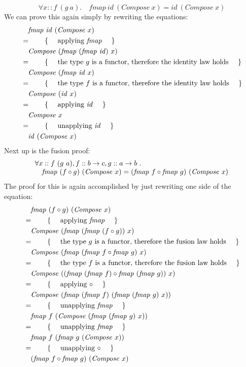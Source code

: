 \begin{displaymath}
\forall x :: \mathit{f}~(g~a). \quad \mathit{fmap}~\mathit{id}~(\mathit{Compose}~x) = \mathit{id}~(\mathit{Compose}~x)
\end{displaymath}
We can prove this again simply by rewriting the equations:
\begin{align*}
&\quad \mathit{fmap}~\mathit{id}~(\mathit{Compose}~x)\\
&=\qquad\text{\{\quad\ applying $\mathit{fmap}$ \quad\}}\\
&\quad \mathit{Compose}~(\mathit{fmap}~(\mathit{fmap}~\mathit{id})~x)\\
&=\qquad\text{\{\quad\ the type $g$ is a functor, therefore the identity law holds \quad\}}\\
&\quad \mathit{Compose}~(\mathit{fmap}~\mathit{id}~x)\\
&=\qquad\text{\{\quad\ the type $f$ is a functor, therefore the identity law holds \quad\}}\\
&\quad \mathit{Compose}~(\mathit{id}~x)\\
&=\qquad\text{\{\quad\ applying $\mathit{id}$ \quad\}}\\
&\quad \mathit{Compose}~x\\
&=\qquad\text{\{\quad\ unapplying $\mathit{id}$ \quad\}}\\
&\quad \mathit{id}~(\mathit{Compose}~x)
\end{align*}
Next up is the fusion proof:
\begin{displaymath}
\begin{array}{lc}
\forall x :: f~(g~a), f :: b \to c, g :: a \to b~. & \\ 
\multicolumn{2}{l}{\quad \mathit{fmap}~(f \circ g)~(\mathit{Compose}~x) = (\mathit{fmap}~f \circ \mathit{fmap}~g)~(\mathit{Compose}~x)}
\end{array}
\end{displaymath}
The proof for this is again accomplished by just rewriting one side of the equation:
\begin{align*}
&\quad \mathit{fmap}~(f \circ g)~(\mathit{Compose}~x)\\
&=\qquad\text{\{\quad\ applying $\mathit{fmap}$ \quad\}}\\
&\quad \mathit{Compose}~(\mathit{fmap}~(\mathit{fmap}~(f \circ g))~x)\\
&=\qquad\text{\{\quad\ the type $g$ is a functor, therefore the fusion law holds \quad\}}\\
&\quad \mathit{Compose}~(\mathit{fmap}~(\mathit{fmap}~f \circ \mathit{fmap}~g)~x)\\
&=\qquad\text{\{\quad\ the type $f$ is a functor, therefore the fusion law holds \quad\}}\\
&\quad \mathit{Compose}~((\mathit{fmap}~(\mathit{fmap}~f) \circ \mathit{fmap}~(\mathit{fmap}~g))~x)\\
&=\qquad\text{\{\quad\ applying $\circ$ \quad\}}\\
&\quad \mathit{Compose}~(\mathit{fmap}~(\mathit{fmap}~f)~(\mathit{fmap}~(\mathit{fmap}~g)~x))\\
&=\qquad\text{\{\quad\ unapplying $\mathit{fmap}$ \quad\}}\\
&\quad \mathit{fmap}~f~(\mathit{Compose}~(\mathit{fmap}~(\mathit{fmap}~g)~x))\\
&=\qquad\text{\{\quad\ unapplying $\mathit{fmap}$ \quad\}}\\
&\quad \mathit{fmap}~f~(\mathit{fmap}~g~(\mathit{Compose}~x))\\
&=\qquad\text{\{\quad\ unapplying $\circ$ \quad\}}\\
&\quad (\mathit{fmap}~f \circ \mathit{fmap}~g)~(\mathit{Compose}~x)
\end{align*}